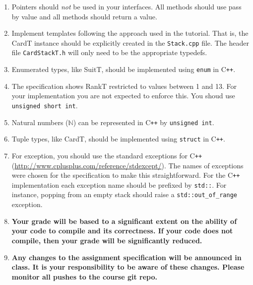 \documentclass[12pt]{article}
\newcommand\CC{C\texttt{++}}
\begin{document}
\begin{enumerate}
\begin{lstlisting}
\end{lstlisting}
\item Pointers should \emph{not} be used in your interfaces.  All methods should
  use pass by value and all methods should return a value.
\item Implement templates following the approach used in the tutorial.  That is,
  the CardT instance should be explicitly created in the \texttt{Stack.cpp}
  file.  The header file \texttt{CardStackT.h} will only need to be the
  appropriate typedefs.
\item Enumerated types, like SuitT, should be implemented using \texttt{enum} in
  \CC{}.
\item The specification shows RankT restricted to values between 1 and 13.  For
  your implementation you are not expected to enforce this.  You shoud use
  \texttt{unsigned short int}.
\item Natural numbers ($\mathbb{N}$) can be represented in \CC{} by
  \texttt{unsigned int}.
\item Tuple types, like CardT, should be implemented using \texttt{struct} in \CC{}.
\item For exception, you should use the standard exceptions for \CC{}
  (\url{http://www.cplusplus.com/reference/stdexcept/}).  The names of
  exceptions were chosen for the specification to make this straightforward.
  For the \CC{} implementation each exception name should be prefixed by
  \texttt{std::}.  For instance, popping from an empty stack should raise a
  \texttt{std::out\_of\_range} exception.
\item \textbf{Your grade will be based to a significant extent on the ability of
    your code to compile and its correctness.  If your code does not compile,
    then your grade will be significantly reduced.}
\item \textbf{Any changes to the assignment specification will be announced in
    class.  It is your responsibility to be aware of these changes.  Please
    monitor all pushes to the course git repo.}
\end{enumerate}
\end{document}
